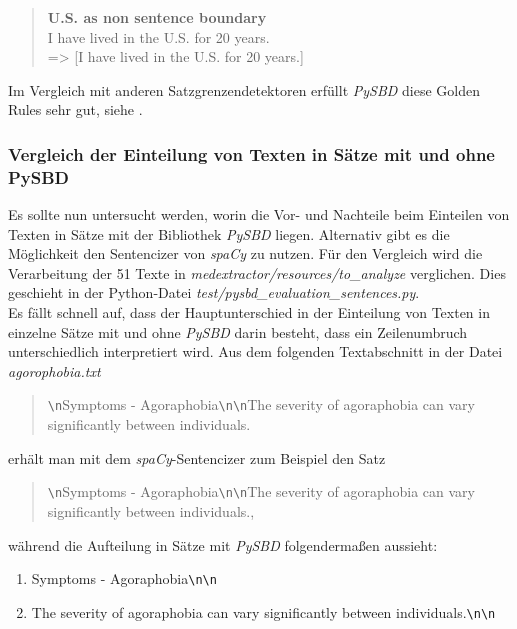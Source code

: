 \begin{quotation}
	\textbf{\glqq U.S. as non sentence boundary\grqq}\\
	I have lived in the U.S. for 20 years. \\
	=> [\glqq I have lived in the U.S. for 20 years.\grqq]\\
\end{quotation}

Im Vergleich mit anderen Satzgrenzendetektoren erfüllt \emph{PySBD} diese Golden Rules sehr gut, siehe \cite{sadvilkar_pysbd_2020}.

\subsubsection{Vergleich der Einteilung von Texten in Sätze mit und ohne PySBD}
Es sollte nun untersucht werden, worin die Vor- und Nachteile beim Einteilen von Texten in Sätze mit der Bibliothek \emph{PySBD} liegen. 
Alternativ gibt es die Möglichkeit den Sentencizer von \emph{spaCy }zu nutzen. Für den Vergleich wird die Verarbeitung der 51 Texte in 
\emph{medextractor/resources/to\_analyze} verglichen. Dies geschieht in der Python-Datei \emph{test/pysbd\_evaluation\_sentences.py}.\\

Es fällt schnell auf, dass der Hauptunterschied in der Einteilung von Texten in einzelne Sätze mit und ohne \emph{PySBD} darin besteht, 
dass ein Zeilenumbruch unterschiedlich interpretiert wird.
Aus dem folgenden Textabschnitt in der Datei \emph{agorophobia.txt}\\

\begin{quotation}
	\glqq \verb!\n!Symptoms - Agoraphobia\verb!\n!\verb!\n!The severity of agoraphobia can vary significantly between individuals.\grqq
\end{quotation}

erhält man mit dem \emph{spaCy}-Sentencizer zum Beispiel den Satz

\begin{quotation}
	\glqq \verb!\n!Symptoms - Agoraphobia\verb!\n!\verb!\n!The severity of agoraphobia can vary significantly between individuals.\grqq,
\end{quotation}

während die Aufteilung in Sätze mit \emph{PySBD} folgendermaßen aussieht:

\begin{enumerate}
	\item \glqq Symptoms - Agoraphobia\verb!\n!\verb!\n!\grqq
	\item \glqq The severity of agoraphobia can vary significantly between individuals.\verb!\n!\verb!\n!\grqq
\end{enumerate}


